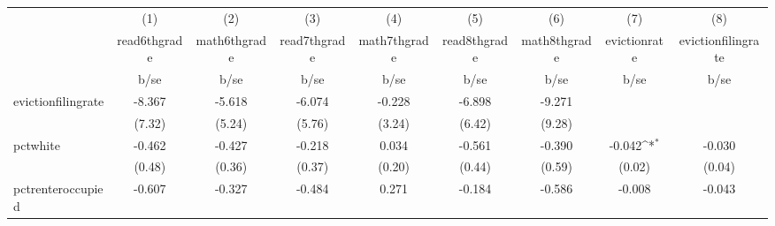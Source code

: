{
\def\sym#1{\ifmmode^{#1}\else\(^{#1}\)\fi}
\begin{tabular}{l*{8}{c}}
\hline\hline
            &\multicolumn{1}{c}{(1)}           &\multicolumn{1}{c}{(2)}           &\multicolumn{1}{c}{(3)}           &\multicolumn{1}{c}{(4)}           &\multicolumn{1}{c}{(5)}           &\multicolumn{1}{c}{(6)}           &\multicolumn{1}{c}{(7)}           &\multicolumn{1}{c}{(8)}           \\
            &\multicolumn{1}{c}{read6thgrade}  &\multicolumn{1}{c}{math6thgrade}  &\multicolumn{1}{c}{read7thgrade}  &\multicolumn{1}{c}{math7thgrade}  &\multicolumn{1}{c}{read8thgrade}  &\multicolumn{1}{c}{math8thgrade}  &\multicolumn{1}{c}{evictionrate}  &\multicolumn{1}{c}{evictionfilingrate}\\
            &                     b/se         &                     b/se         &                     b/se         &                     b/se         &                     b/se         &                     b/se         &                     b/se         &                     b/se         \\
\hline
evictionfilingrate&                   -8.367         &                   -5.618         &                   -6.074         &                   -0.228         &                   -6.898         &                   -9.271         &                                  &                                  \\
            &                   (7.32)         &                   (5.24)         &                   (5.76)         &                   (3.24)         &                   (6.42)         &                   (9.28)         &                                  &                                  \\
pctwhite    &                   -0.462         &                   -0.427         &                   -0.218         &                    0.034         &                   -0.561         &                   -0.390         &                   -0.042\sym{*}  &                   -0.030         \\
            &                   (0.48)         &                   (0.36)         &                   (0.37)         &                   (0.20)         &                   (0.44)         &                   (0.59)         &                   (0.02)         &                   (0.04)         \\
pctrenteroccupied&                   -0.607         &                   -0.327         &                   -0.484         &                    0.271         &                   -0.184         &                   -0.586         &                   -0.008         &                   -0.043         \\

\end{tabular}}
